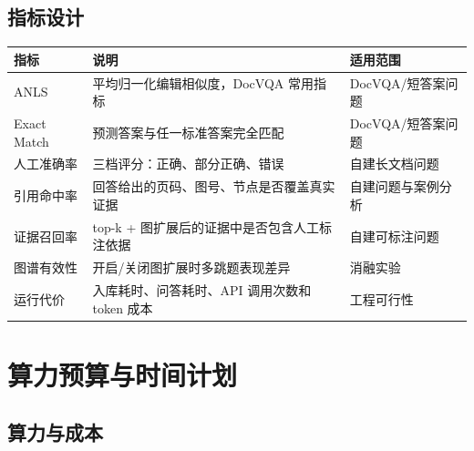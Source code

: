 \section{指标设计}\label{ux6307ux6807ux8bbeux8ba1}

\begin{longtable}[]{@{}
  >{\raggedright\arraybackslash}p{}
  >{\raggedright\arraybackslash}p{}
  >{\raggedright\arraybackslash}p{}@{}}
\toprule\noalign{}
\begin{minipage}[b]{\linewidth}\raggedright
指标
\end{minipage} & \begin{minipage}[b]{\linewidth}\raggedright
说明
\end{minipage} & \begin{minipage}[b]{\linewidth}\raggedright
适用范围
\end{minipage} \\
\midrule\noalign{}
\endhead
\bottomrule\noalign{}
\endlastfoot
ANLS & 平均归一化编辑相似度，DocVQA 常用指标 & DocVQA/短答案问题 \\
Exact Match & 预测答案与任一标准答案完全匹配 & DocVQA/短答案问题 \\
人工准确率 & 三档评分：正确、部分正确、错误 & 自建长文档问题 \\
引用命中率 & 回答给出的页码、图号、节点是否覆盖真实证据 &
自建问题与案例分析 \\
证据召回率 & top-k + 图扩展后的证据中是否包含人工标注依据 &
自建可标注问题 \\
图谱有效性 & 开启/关闭图扩展时多跳题表现差异 & 消融实验 \\
运行代价 & 入库耗时、问答耗时、API 调用次数和 token 成本 & 工程可行性 \\
\end{longtable}

\chapter{算力预算与时间计划}\label{ux516dux7b97ux529bux9884ux7b97ux4e0eux65f6ux95f4ux8ba1ux5212}

\section{算力与成本}\label{ux7b97ux529bux4e0eux6210ux672c}

